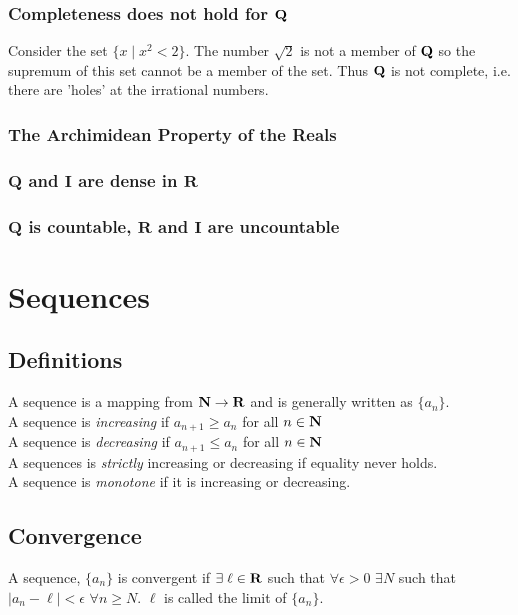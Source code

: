 \documentclass[12pt]{article}
\begin{document}
    \subsubsection{Completeness does not hold for $\mathbf{Q}$}
      Consider the set $\{x \mid x^2 < 2\}$. The number $\sqrt{2}$ is not a member of $\mathbf{Q}$ so the supremum of this
      set cannot be a member of the set. Thus $\mathbf{Q}$ is not complete, i.e. there are 'holes' at the irrational numbers.
    \subsubsection{The Archimidean Property of the Reals}
    \subsubsection{$\mathbf{Q}$ and $\mathbf{I}$ are dense in $\mathbf{R}$}
    \subsubsection{$\mathbf{Q}$ is countable, $\mathbf{R}$ and $\mathbf{I}$ are uncountable}
\section{Sequences}
  \subsection{Definitions}
    A sequence is a mapping from $\mathbf{N} \to \mathbf{R}$ and is generally written as $\{a_n\}$.\\

    A sequence is \emph{increasing} if $a_{n+1} \geq a_n$ for all $n \in \mathbf{N}$\\
    A sequence is \emph{decreasing} if $a_{n+1} \leq a_n$ for all $n \in \mathbf{N}$\\
    A sequences is \emph{strictly} increasing or decreasing if equality never holds.\\
    A sequence is \emph{monotone} if it is increasing or decreasing.\\

  \subsection{Convergence}
    A sequence, $\{a_n\}$ is convergent if $\exists\;\ell \in \mathbf{R}$ such that $\forall \epsilon > 0$ 
    $\exists N$ such that $|a_n - \ell| < \epsilon$ $\forall n \geq N$. $\ell$ is called the limit of $\{a_n\}$.\\
    
\end{document}
